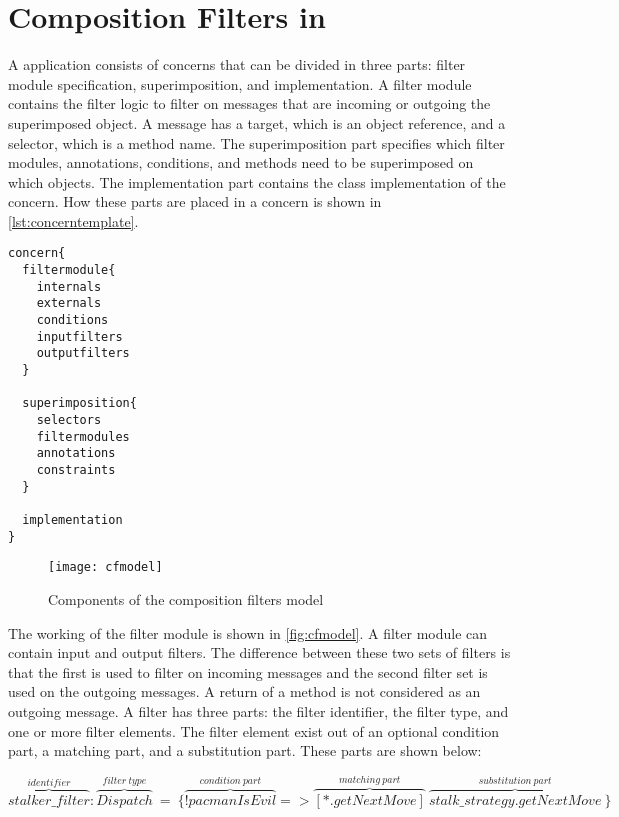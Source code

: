 \section{Composition Filters in \Compose*{}}
\label{sec:CompositionFiltersInComposeStar}
A \Compose* application consists of concerns that can be divided in three parts: filter module specification, superimposition, and implementation. A filter module contains the filter logic to filter on messages that are incoming or outgoing the superimposed object. A message has a target, which is an object reference, and a selector, which is a method name. The superimposition part specifies which filter modules, annotations, conditions, and methods need to be superimposed on which objects. The implementation part contains the class implementation of the concern. How these parts are placed in
a concern is shown in \autoref{lst:concerntemplate}.

\begin{lstlisting}[language={Composestar},style=floatlisting,%
                   caption={Abstract concern template},label={lst:concerntemplate},%
                   floatplacement=hbp]%removed "t" so that it is not longer breaking the history list
concern{
  filtermodule{
    internals
    externals
    conditions
    inputfilters
    outputfilters
  }
  
  superimposition{
    selectors
    filtermodules
    annotations
    constraints
  }
  
  implementation
}
\end{lstlisting}

\begin{figure}
  \centering
  \texttt{[image: cfmodel]}
  \caption{Components of the composition filters model}
  \label{fig:cfmodel}
\end{figure}
The working of the filter module is shown in \autoref{fig:cfmodel}.
A filter module can contain input and output filters. The difference between these two
sets of filters is that the first is used to filter on incoming messages and the second 
filter set is used on the outgoing messages. A return of a method is not considered as an outgoing message.
A filter has three parts: the filter identifier, 
the filter type, and one or more filter elements. The filter element exist out of an optional condition part, a matching part, and a substitution part. These parts are shown below:

\begin{center}
$\overbrace{stalker\_filter}^{identifier}:\overbrace{Dispatch}^{filter~type}~=~\{\overbrace{!pacmanIsEvil}^{condition~part}
=>\overbrace{[*.getNextMove]}^{matching~part}~\overbrace{stalk\_strategy.getNextMove}^{substitution~part}~\}$
\end{center}

